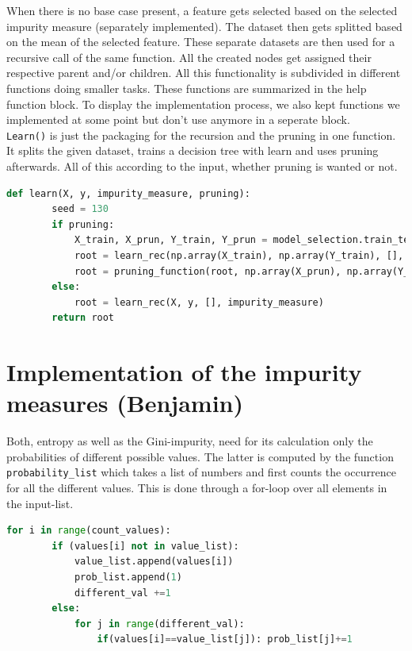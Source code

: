 \documentclass[12pt,a4paper]{scrartcl}		%
\begin{document}
When there is no base case 
present, a feature gets selected based on the selected impurity measure (separately implemented).
The dataset then gets splitted based on the mean of the selected feature. These separate datasets are then 
used for a recursive call of the same function. All the created nodes get assigned their respective parent 
and/or children.
All this functionality is subdivided in different functions doing smaller tasks.
These functions are summarized in the help function block. 
To display the implementation process, we also kept functions we implemented at some point but don't use 
anymore in a seperate block. \\

\texttt{Learn()}  is just the packaging for the recursion and the pruning in one function. It splits the given dataset, 
trains a decision tree with learn and uses pruning afterwards. All of this according to the input, whether 
pruning is wanted or not.

\begin{lstlisting}[language=Python]
    def learn(X, y, impurity_measure, pruning):
        seed = 130
        if pruning:
            X_train, X_prun, Y_train, Y_prun = model_selection.train_test_split(X, y, test_size= 0.1, shuffle=True, random_state = seed)
            root = learn_rec(np.array(X_train), np.array(Y_train), [], impurity_measure) 
            root = pruning_function(root, np.array(X_prun), np.array(Y_prun))
        else:
            root = learn_rec(X, y, [], impurity_measure) 
        return root
\end{lstlisting}

\section{Implementation of the impurity measures (Benjamin)}
Both, entropy as well as the Gini-impurity, need for its calculation only the probabilities of different 
possible values. The latter is computed by the function \texttt{probability\_list} which takes a list of numbers 
and first counts the occurrence for all the different values. This is done through a for-loop over all 
elements in the input-list. 

\begin{lstlisting}[language=Python]
    for i in range(count_values):
        if (values[i] not in value_list): 
            value_list.append(values[i])
            prob_list.append(1)
            different_val +=1
        else:
            for j in range(different_val):
                if(values[i]==value_list[j]): prob_list[j]+=1
\end{lstlisting}
 
\end{document}
